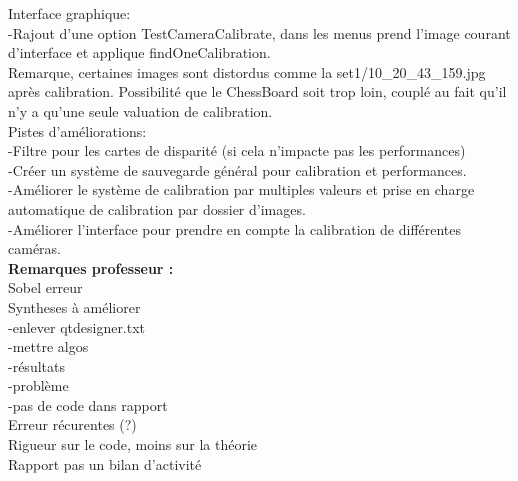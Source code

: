 \documentclass{article}
\begin{document}
Interface graphique:\\
    -Rajout d'une option TestCameraCalibrate, dans les menus prend l'image courant d'interface et applique findOneCalibration.\\
Remarque, certaines images sont distordus comme la set1/10\_20\_43\_159.jpg après calibration. Possibilité que le ChessBoard soit trop loin, couplé au fait qu'il n'y a qu'une seule valuation de calibration.
   \\

Pistes d'améliorations:\\
    -Filtre pour les cartes de disparité (si cela n'impacte pas les performances)\\
    -Créer un système de sauvegarde général pour calibration et performances.\\
    -Améliorer le système de calibration par multiples valeurs et prise en charge automatique de calibration par dossier d'images.\\
    -Améliorer l'interface pour prendre en compte la calibration de différentes caméras.\\

\textbf{Remarques professeur :}\\
Sobel erreur\\
Syntheses à améliorer\\
-enlever qtdesigner.txt\\
-mettre algos\\
-résultats\\
-problème\\
-pas de code dans rapport\\

Erreur récurentes (?)\\
Rigueur sur le code, moins sur la théorie\\
Rapport pas un bilan d'activité\\


\newpage
\end{document}
